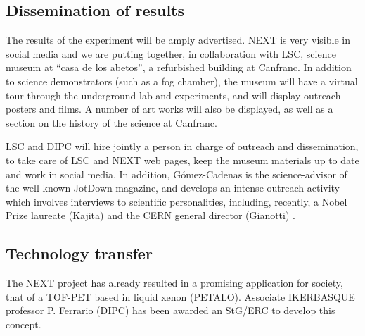 
\subsection{Dissemination of results}

\indent
The results of the experiment will be amply advertised. NEXT is very visible in social media and we are putting together, in collaboration with LSC, science museum at ``casa de los abetos'', a refurbished building at Canfranc. In addition to science demonstrators (such as a fog chamber), the museum will have a virtual tour through the underground lab and experiments, and will display outreach posters and films. A number of art works will also be displayed, as well as a section on the history of the science at Canfranc. 

\indent

LSC and DIPC will hire jointly a person in charge of outreach and dissemination, to take care of LSC and NEXT web pages, keep the museum materials up to date and work in social media. In addition, G\'omez-Cadenas
is the science-advisor of the well known JotDown magazine, and develops an intense outreach activity which involves interviews to scientific personalities, including, recently, a Nobel Prize laureate (Kajita) and the CERN general director (Gianotti) .

\subsection{Technology transfer}
The NEXT project has already resulted in a promising application for society, that of a TOF-PET based in liquid xenon (PETALO). Associate IKERBASQUE professor P. Ferrario (DIPC) has been awarded an StG/ERC to develop this concept.



